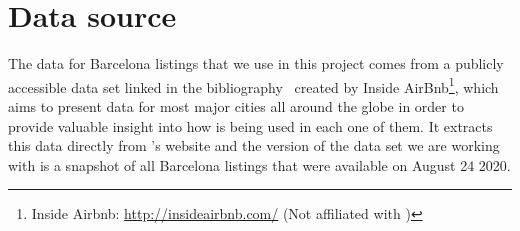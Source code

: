 

\section{Data source}%
\label{sec:data_source}

The \airbnb data for Barcelona listings that we use in this project comes from a
publicly accessible data set linked in the bibliography~\cite{dataset} created
by Inside AirBnb\footnote{Inside Airbnb: \url{http://insideairbnb.com/} (Not
affiliated with \airbnb)}, which aims to present \airbnb data for most major
cities all around the globe in order to provide valuable insight into how
\airbnb is being used in each one of them.  It extracts this data directly from
\airbnb's website and the version of the data set we are working with is a
snapshot of all Barcelona listings that were available on August 24 2020.
